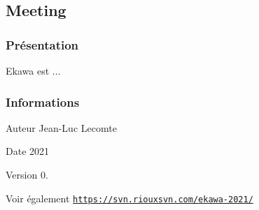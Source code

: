 \hypertarget{page__r_e_a_d_m_e_projet}{}\subsection{Meeting}\label{page__r_e_a_d_m_e_projet}
\hypertarget{page__r_e_a_d_m_e_presentation}{}\subsubsection{Présentation}\label{page__r_e_a_d_m_e_presentation}
Ekawa est ...\hypertarget{page__r_e_a_d_m_e_informations}{}\subsubsection{Informations}\label{page__r_e_a_d_m_e_informations}
\begin{DoxyAuthor}{Auteur}
Jean-\/\+Luc Lecomte 
\end{DoxyAuthor}
\begin{DoxyDate}{Date}
2021 
\end{DoxyDate}
\begin{DoxyVersion}{Version}
0. 
\end{DoxyVersion}
\begin{DoxySeeAlso}{Voir également}
\href{https://svn.riouxsvn.com/ekawa-2021/}{\tt https\+://svn.\+riouxsvn.\+com/ekawa-\/2021/} 
\end{DoxySeeAlso}
